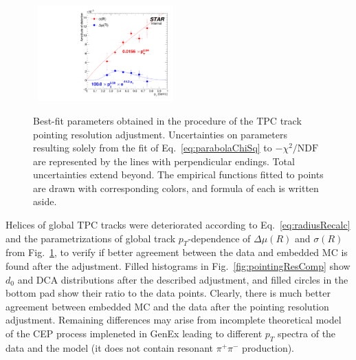 
  
\begin{figure}\vspace*{-15pt}
  \centering
  ~\includegraphics[width=0.465\textwidth]{graphics/tpcHelixAdj/DistortionVsPt.pdf}\vspace*{-5pt}
  \caption[Best-fit parameters obtained in the procedure of the TPC track pointing resolution adjustment.]
   {Best-fit parameters obtained in the procedure of the TPC track pointing resolution adjustment. Uncertainties on parameters resulting solely from the fit of Eq.~\eqref{eq:parabolaChiSq} to $-\chi^{2}/\text{NDF}$ are represented by the lines with perpendicular endings. Total uncertainties extend beyond. The empirical functions fitted to points are drawn with corresponding colors, and formula of each is written aside.}
   \label{fig:distortionVsPt}%
\end{figure}
Helices of global TPC tracks were deteriorated according to Eq.~\eqref{eq:radiusRecalc} and the parametrizations of global track $p_{T}$-dependence of $\Delta\mu(R)$ and $\sigma(R)$ from Fig.~\ref{fig:distortionVsPt}, to verify if better agreement between the data and embedded MC is found after the adjustment. Filled histograms in Fig.~\ref{fig:pointingResComp} show $d_{0}$ and DCA distributions after the described adjustment, and filled circles in the bottom pad show their ratio to the data points. Clearly, there is much better agreement between embedded MC and the data after the pointing resolution adjustment. Remaining differences may arise from incomplete theoretical model of the CEP process impleneted in GenEx leading to different $p_{T}$ spectra of the data and the model (it does not contain resonant $\pi^{+}\pi^{-}$ production).





